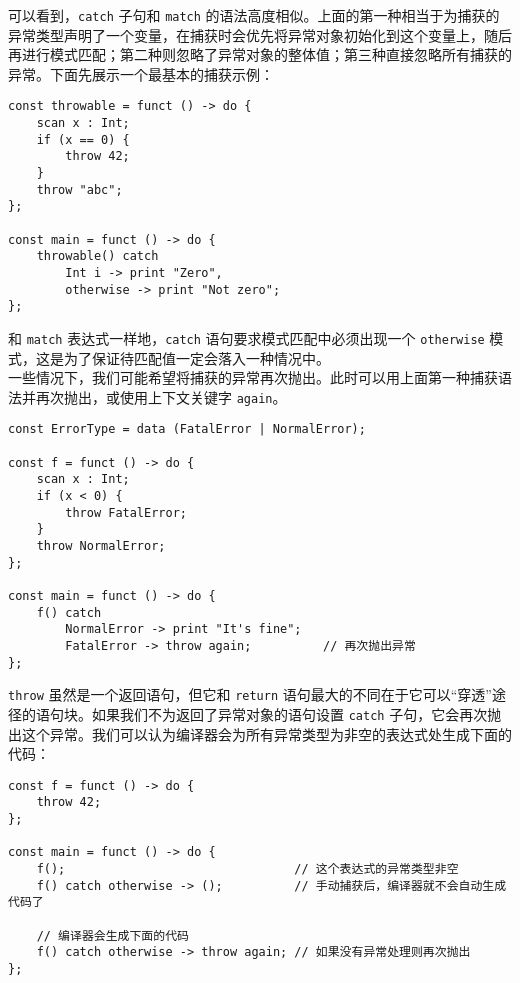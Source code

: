 可以看到，\lstinline!catch! 子句和 \lstinline!match! 的语法高度相似。上面的第一种相当于为捕获的异常类型声明了一个变量，在捕获时会优先将异常对象初始化到这个变量上，随后再进行模式匹配；第二种则忽略了异常对象的整体值；第三种直接忽略所有捕获的异常。下面先展示一个最基本的捕获示例：

\begin{lstlisting}
const throwable = funct () -> do {
	scan x : Int;
	if (x == 0) {
	    throw 42;
	}
	throw "abc";
};

const main = funct () -> do {
	throwable() catch
		Int i -> print "Zero",
		otherwise -> print "Not zero";
};
\end{lstlisting}

和 \lstinline!match! 表达式一样地，\lstinline!catch! 语句要求模式匹配中必须出现一个 \lstinline!otherwise! 模式，这是为了保证待匹配值一定会落入一种情况中。 \\

一些情况下，我们可能希望将捕获的异常再次抛出。此时可以用上面第一种捕获语法并再次抛出，或使用上下文关键字 \lstinline!again!。

\begin{lstlisting}
const ErrorType = data (FatalError | NormalError);

const f = funct () -> do {
	scan x : Int;
	if (x < 0) {
		throw FatalError;
	}
	throw NormalError;
};

const main = funct () -> do {
	f() catch
		NormalError -> print "It's fine";
		FatalError -> throw again;			// 再次抛出异常
};
\end{lstlisting}

\lstinline!throw! 虽然是一个返回语句，但它和 \lstinline!return! 语句最大的不同在于它可以“穿透”途径的语句块。如果我们不为返回了异常对象的语句设置 \lstinline!catch! 子句，它会再次抛出这个异常。我们可以认为编译器会为所有异常类型为非空的表达式处生成下面的代码：

\begin{minipage}[c]{0.95\textwidth}
\vspace{1.0em}
\begin{lstlisting}
const f = funct () -> do {
    throw 42;
};

const main = funct () -> do {
    f();								// 这个表达式的异常类型非空
    f() catch otherwise -> ();			// 手动捕获后，编译器就不会自动生成代码了
    
    // 编译器会生成下面的代码
    f() catch otherwise -> throw again;	// 如果没有异常处理则再次抛出
};
\end{lstlisting}
\end{minipage}

